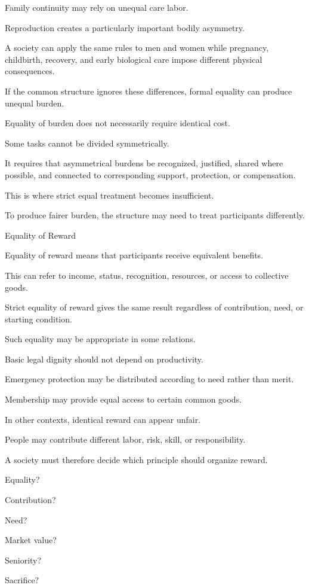 Family continuity may rely on unequal care labor.

Reproduction creates a particularly important bodily asymmetry.

A society can apply the same rules to men and women while pregnancy, childbirth, recovery, and early biological care impose different physical consequences.

If the common structure ignores these differences, formal equality can produce unequal burden.

Equality of burden does not necessarily require identical cost.

Some tasks cannot be divided symmetrically.

It requires that asymmetrical burdens be recognized, justified, shared where possible, and connected to corresponding support, protection, or compensation.

This is where strict equal treatment becomes insufficient.

To produce fairer burden, the structure may need to treat participants differently.

Equality of Reward

Equality of reward means that participants receive equivalent benefits.

This can refer to income, status, recognition, resources, or access to collective goods.

Strict equality of reward gives the same result regardless of contribution, need, or starting condition.

Such equality may be appropriate in some relations.

Basic legal dignity should not depend on productivity.

Emergency protection may be distributed according to need rather than merit.

Membership may provide equal access to certain common goods.

In other contexts, identical reward can appear unfair.

People may contribute different labor, risk, skill, or responsibility.

A society must therefore decide which principle should organize reward.

Equality?

Contribution?

Need?

Market value?

Seniority?

Sacrifice?

